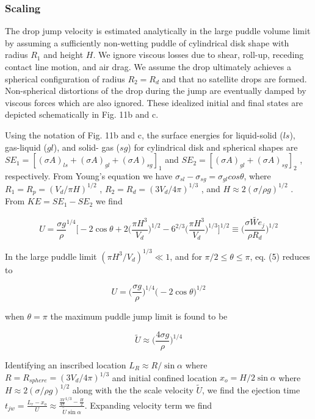 \documentclass{article}
\begin{document}
\subsubsection*{Scaling}
The drop jump velocity is estimated analytically in the large puddle volume limit by assuming a
sufficiently non-wetting puddle of cylindrical disk shape with radius $R_1$ and height $H$. We ignore viscous
losses due to shear, roll-up, receding contact line motion, and air drag. We assume the drop ultimately
achieves a spherical configuration of radius $R_2 = R_d$ and that no satellite drops are formed. Non-spherical
distortions of the drop during the jump are eventually damped by viscous forces which are also ignored.
These idealized initial and final states are depicted schematically in Fig. 11b and c.

Using the notation of Fig. 11b and c, the surface energies for liquid-solid ($ls$), gas-liquid ($gl$), and solid-
gas ($sg$) for cylindrical disk and spherical shapes are $SE_1 = [(\sigma A)_{ls} + (\sigma A)_{gl} + (\sigma A)_{sg} ]_1$ and $SE_2 = [(\sigma A)_{gl} +
(\sigma A)_{sg} ]_2$ , respectively. From Young’s equation we have $\sigma_{sl} - \sigma_{sg} = \sigma_{gl} cos\theta$, where $R_1 = R_p = (V_d /\pi H)^{1/2}$ , $R_2
= R_d = (3V_d /4\pi)^{1/3}$ , and $H \approx 2(\sigma/\rho g)^{1/2}$ . From $KE = SE_1 - SE_2$ we find

\begin{equation}
{U} = \frac{\sigma g}{\rho}^{1/4} \Big[ -2\cos\theta + 2\big(\frac{\pi H^3}{V_d}\big)^{1/2} - 6^{2/3}\big(\frac{\pi H^3}{V_d}\big)^{1/3}\Big]^{1/2} \equiv \Big(\frac{\sigma \tilde{We}_j}{\rho R_d}\Big)^{1/2}
\end{equation}

In the large puddle limit $(\pi H^3 /V_d)^{1/3} \ll 1$, and for $\pi/2 \leq \theta \leq \pi$, eq. (5) reduces to

\begin{equation}
{U} = \Big(\frac{\sigma g}{\rho}\Big)^{1/4} \big(-2\cos\theta\big)^{1/2}
\end{equation}

when $\theta = \pi$ the maximum puddle jump limit is found to be 

\begin{equation}\tilde{U} \approx \Big(\frac{4\sigma g}{\rho}\Big)^{1/4}
\end{equation}

Identifying an inscribed location $L_R \approx R/\sin\alpha$ where $R
= R_{sphere} = (3V_d /4\pi)^{1/3}$ and initial confined location $x_o = H/2\sin\alpha$ where $H \approx 2(\sigma/\rho g)^{1/2}$ along with the the scale velocity $\tilde{U}$, we find the ejection time $
t_{jw} = \frac{L_r-x_o}{U} \approx \frac{\frac{3V}{4\pi}^{1/3} - \frac{H}{2}}{\tilde{U}\sin\alpha}
$. Expanding velocity term we find 
\end{document}
